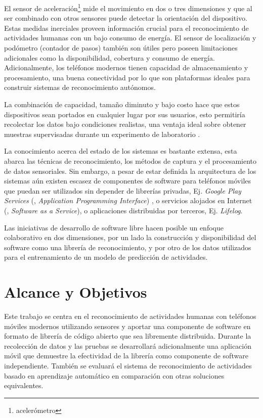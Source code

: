 El sensor de aceleración\footnote{acelerómetro} mide el movimiento
en dos o tres dimensiones y que al ser combinado con otros sensores
puede detectar la orientación del dispositivo. Estas medidas inerciales
proveen información crucial para el reconocimiento de actividades
humanas con un bajo consumo de energía. El sensor de localización
y podómetro (contador de pasos) también son útiles pero poseen limitaciones
adicionales como la disponibilidad, cobertura y consumo de energía.
Adicionalmente, los teléfonos modernos tienen capacidad de almacenamiento
y procesamiento, una buena conectividad por lo que son plataformas
ideales para construir sistemas de reconocimiento autónomos.

La combinación de capacidad, tamaño diminuto y bajo costo hace que
estos dispositivos sean portados en cualquier lugar por sus usuarios,
esto permitiría recolectar los datos bajo condiciones realistas, una
ventaja ideal sobre obtener muestras supervisadas durante un experimento
de laboratorio \cite{Bao2004}. 

La conocimiento acerca del estado de los sistemas  es bastante
extensa, esta abarca las técnicas de reconocimiento, los métodos de
captura y el procesamiento de datos sensoriales\cite{LaraLabrador2012,Kwapisz2011}.
Sin embargo, a pesar de estar definida la arquitectura de los sistemas
 aún existen escasez de componentes de software para teléfonos
móviles que puedan ser utilizados sin depender de librerías privadas,
Ej. \emph{Google Play Services} (, \emph{Application Programming
Interface}) \cite{Google2016l}, o servicios alojados en Internet
(, \emph{Software as a Service}), o aplicaciones distribuidas
por terceros, Ej. \emph{Lifelog}.

Las iniciativas de desarrollo de software libre hacen posible un enfoque
colaborativo en dos dimensiones, por un lado la construcción y disponibilidad
del software como una librería de reconocimiento, y por otro de los
datos utilizados para el entrenamiento de un modelo de predicción
de actividades.

\section{Alcance y Objetivos}

\label{sec13:alcance-y-objetivos}

Este trabajo se centra en el reconocimiento de actividades humanas
con teléfonos móviles modernos utilizando sensores y aportar una componente
de software en formato de librería de código abierto que sea libremente
distribuida. Durante la recolección de datos y las pruebas se desarrollará
adicionalmente una aplicación móvil que demuestre la efectividad de
la librería como componente de software independiente. También se
evaluará el sistema de reconocimiento de actividades basado en aprendizaje
automático en comparación con otras soluciones equivalentes.

